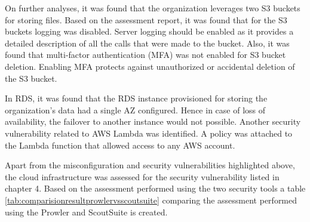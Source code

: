 \par On further analyses, it was found that the organization leverages two S3 buckets for storing files.
Based on the assessment report, it was found that for the S3 buckets logging was disabled.
Server logging should be enabled as it provides a detailed description of all the calls that were made to the bucket.
Also, it was found that multi-factor authentication (MFA) was not enabled for S3 bucket deletion.
Enabling MFA protects against unauthorized or accidental deletion of the S3 bucket.



\par In RDS, it was found that the RDS instance provisioned for storing the organization’s data had a single AZ configured.
Hence in case of loss of availability, the failover to
another instance would not possible.
Another security vulnerability related to AWS Lambda was identified.
A policy was attached to the Lambda function that allowed access to any AWS account.


\par Apart from the misconfiguration and security vulnerabilities highlighted above, the cloud infrastructure was assessed for the security vulnerability listed in chapter 4.
Based on the assessment performed using the two security
tools a table \ref{tab:comparisionresultprowlervsscoutsuite} comparing the assessment performed using the Prowler and ScoutSuite is created.

